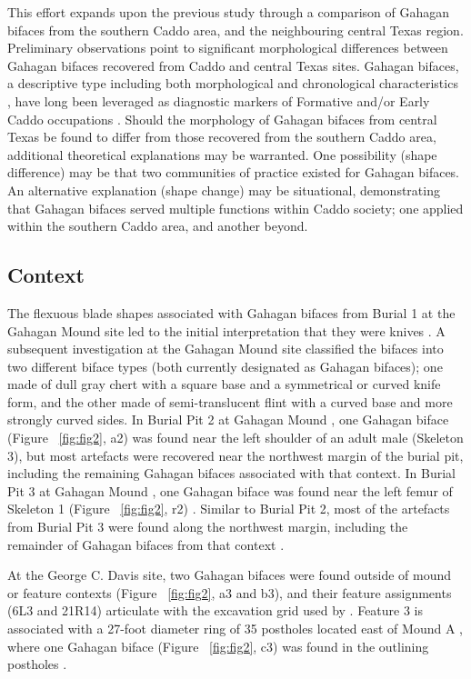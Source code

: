 \documentclass[review]{elsarticle}
\begin{document}
This effort expands upon the previous study through a comparison of Gahagan bifaces from the southern Caddo area, and the neighbouring central Texas region. Preliminary observations point to significant morphological differences between Gahagan bifaces recovered from Caddo and central Texas sites. Gahagan bifaces, a descriptive type including both morphological and chronological characteristics \citep{RN20847}, have long been leveraged as diagnostic markers of Formative and/or Early Caddo occupations \citep{RN4924,RN3684}. Should the morphology of Gahagan bifaces from central Texas be found to differ from those recovered from the southern Caddo area, additional theoretical explanations may be warranted. One possibility (shape difference) may be that two communities of practice existed for Gahagan bifaces. An alternative explanation (shape change) may be situational, demonstrating that Gahagan bifaces served multiple functions within Caddo society; one applied within the southern Caddo area, and another beyond.

\subsection*{Context}

The flexuous blade shapes associated with Gahagan bifaces from Burial 1 at the Gahagan Mound site led to the initial interpretation that they were knives \citep[Figures 18-21]{RN2740}. A subsequent investigation at the Gahagan Mound site \citep{RN5274} classified the bifaces into two different biface types (both currently designated as Gahagan bifaces); one made of dull gray chert with a square base and a symmetrical or curved knife form, and the other made of semi-translucent flint with a curved base and more strongly curved sides. In Burial Pit 2 at Gahagan Mound \citep[Plate 21]{RN5274}, one Gahagan biface (Figure ~\ref{fig:fig2}, a2) \citep[Plate 27, No. 1, 3]{RN5274} was found near the left shoulder of an adult male (Skeleton 3), but most artefacts were recovered near the northwest margin of the burial pit, including the remaining Gahagan bifaces associated with that context. In Burial Pit 3 at Gahagan Mound \citep[Plate 23, 1]{RN5274}, one Gahagan biface was found near the left femur of Skeleton 1 (Figure ~\ref{fig:fig2}, r2) \citep[Plate 27, No. 1, 2]{RN5274}. Similar to Burial Pit 2, most of the artefacts from Burial Pit 3 were found along the northwest margin, including the remainder of Gahagan bifaces from that context \citep{RN5274}.

At the George C. Davis site, two Gahagan bifaces were found outside of mound or feature contexts (Figure ~\ref{fig:fig2}, a3 and b3), and their feature assignments (6L3 and 21R14) articulate with the excavation grid used by \cite{RN800}. Feature 3 is associated with a 27-foot diameter ring of 35 postholes located east of Mound A \citep[Figure 4]{RN800}, where one Gahagan biface (Figure ~\ref{fig:fig2}, c3) was found in the outlining postholes \cite{RN800}.
\end{document}
